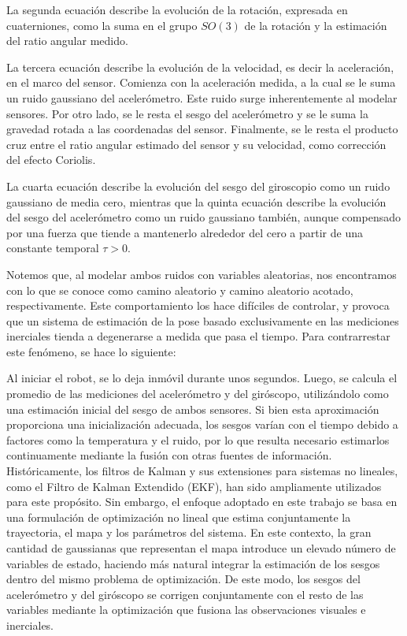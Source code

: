 La segunda ecuación describe la evolución de la rotación, expresada en cuaterniones, como la suma en el grupo $SO(3)$ de la rotación y la estimación del ratio angular medido.

La tercera ecuación describe la evolución de la velocidad, es decir la aceleración, en el marco del sensor. Comienza con la aceleración medida, a la cual se le suma un ruido gaussiano del acelerómetro. Este ruido surge inherentemente al modelar sensores. Por otro lado, se le resta el sesgo del acelerómetro y se le suma la gravedad rotada a las coordenadas del sensor. Finalmente, se le resta el producto cruz entre el ratio angular estimado del sensor y su velocidad, como corrección del efecto Coriolis.

La cuarta ecuación describe la evolución del sesgo del giroscopio como un ruido gaussiano de media cero, mientras que la quinta ecuación describe la evolución del sesgo del acelerómetro como un ruido gaussiano también, aunque compensado por una fuerza que tiende a mantenerlo alrededor del cero a partir de una constante temporal $\tau > 0$.

Notemos que, al modelar ambos ruidos con variables aleatorias, nos encontramos con lo que se conoce como camino aleatorio y camino aleatorio acotado, respectivamente. Este comportamiento los hace difíciles de controlar, y provoca que un sistema de estimación de la pose basado exclusivamente en las mediciones inerciales tienda a degenerarse a medida que pasa el tiempo. Para contrarrestar este fenómeno, se hace lo siguiente:

Al iniciar el robot, se lo deja inmóvil durante unos segundos. Luego, se calcula el promedio de las mediciones del acelerómetro y del giróscopo, utilizándolo como una estimación inicial del sesgo de ambos sensores. Si bien esta aproximación proporciona una inicialización adecuada, los sesgos varían con el tiempo debido a factores como la temperatura y el ruido, por lo que resulta necesario estimarlos continuamente mediante la fusión con otras fuentes de información. Históricamente, los filtros de Kalman \cite{MasnadiShirazi2019KalmanTutorial} y sus extensiones para sistemas no lineales, como el Filtro de Kalman Extendido (EKF), han sido ampliamente utilizados para este propósito. Sin embargo, el enfoque adoptado en este trabajo se basa en una formulación de optimización no lineal que estima conjuntamente la trayectoria, el mapa y los parámetros del sistema. En este contexto, la gran cantidad de gaussianas que representan el mapa introduce un elevado número de variables de estado, haciendo más natural integrar la estimación de los sesgos dentro del mismo problema de optimización. De este modo, los sesgos del acelerómetro y del giróscopo se corrigen conjuntamente con el resto de las variables mediante la optimización que fusiona las observaciones visuales e inerciales.
